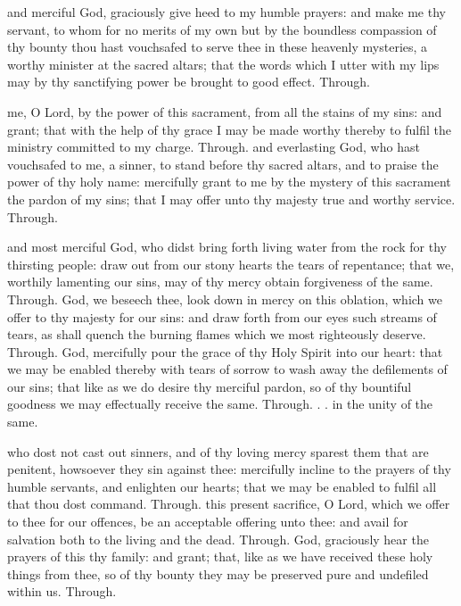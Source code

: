 \begin{multicols}{2}
\vspace{-1.5ex}

 and merciful God, graciously give heed to my humble prayers: and make me thy servant, to whom for no merits of my own but by the boundless compassion of thy bounty thou hast vouchsafed to serve thee in these heavenly mysteries, a worthy minister at the sacred altars; that the words which I utter with my lips may by thy sanctifying power be brought to good effect. Through.

\vspace{-1.5ex}

 me, O Lord, by the power of this sacrament, from all the stains of my sins: and grant; that with the help of thy grace I may be made worthy thereby to fulfil the ministry committed to my charge. Through.
 and everlasting God, who hast vouchsafed to me, a sinner, to stand before thy sacred altars, and to praise the power of thy holy name: mercifully grant to me by the mystery of this sacrament the pardon of my sins; that I may offer unto thy majesty true and worthy service. Through.

 and most merciful God, who didst bring forth living water from the rock for thy thirsting people: draw out from our stony hearts the tears of repentance; that we, worthily lamenting our sins, may of thy mercy obtain forgiveness of the same. Through.
 God, we beseech thee, look down in mercy on this oblation, which we offer to thy majesty for our sins: and draw forth from our eyes such streams of tears, as shall quench the burning flames which we most righteously deserve. Through.
 God, mercifully pour the grace of thy Holy Spirit into our heart: that we may be enabled thereby with tears of sorrow to wash away the defilements of our sins; that like as we do desire thy merciful pardon, so of thy bountiful goodness we may effectually receive the same. Through. . . in the unity of the same.

 who dost not cast out sinners, and of thy loving mercy sparest them that are penitent, howsoever they sin against thee: mercifully incline to the prayers of thy humble servants, and enlighten our hearts; that we may be enabled to fulfil all that thou dost command. Through.
 this present sacrifice, O Lord, which we offer to thee for our offences, be an acceptable offering unto thee: and avail for salvation both to the living and the dead. Through.
 God, graciously hear the prayers of this thy family: and grant; that, like as we have received these holy things from thee, so of thy bounty they may be preserved pure and undefiled within us. Through.


\end{multicols}

